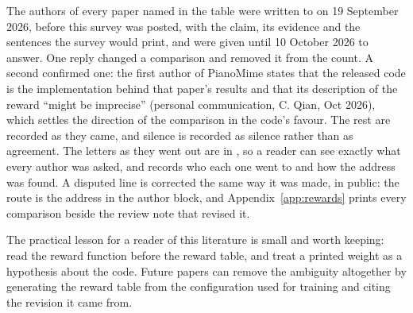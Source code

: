 The authors of every paper named in the table were written to on 19 September 2026, before this
survey was posted, with the claim, its evidence and the sentences the survey would print, and were
given until 10 October 2026 to answer. One reply changed a comparison and removed it from the
count. A second confirmed one: the first author of PianoMime \cite{pianomime_2024} states that the
released code is the implementation behind that paper's results and that its description of the
reward ``might be imprecise'' (personal communication, C. Qian, Oct 2026), which settles the
direction of the comparison in the code's favour. The rest are recorded as they came, and silence
is recorded as silence rather than as agreement. The letters as they went out are in , so a reader can see exactly what
every author was asked, and  records who each one went to and how the
address was found. A disputed line is corrected the same way it was made, in public: the route is
the address in the author block, and Appendix~\ref{app:rewards} prints every comparison beside the
review note that revised it.

The practical lesson for a reader of this literature is small and worth keeping: read the reward
function before the reward table, and treat a printed weight as a hypothesis about the code.
Future papers can remove the ambiguity altogether by generating the reward table from the
configuration used for training and citing the revision it came from.
